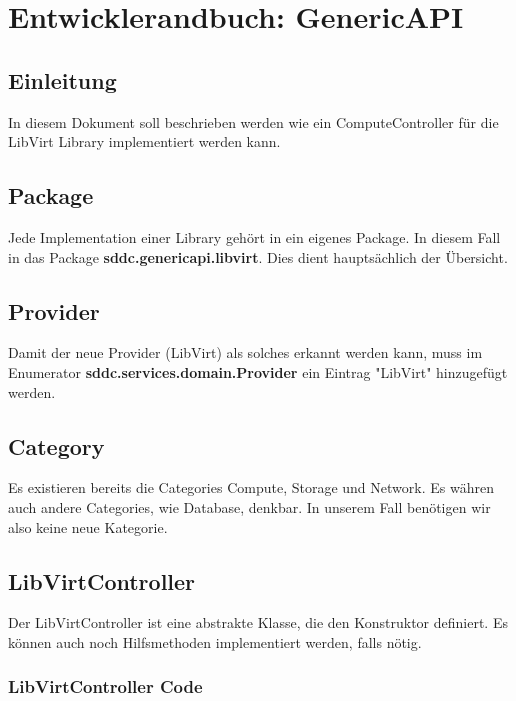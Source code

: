 \chapter{Entwicklerandbuch: GenericAPI}
\section{Einleitung}
In diesem Dokument soll beschrieben werden wie ein ComputeController für die LibVirt Library implementiert werden kann. 

\section{Package}
Jede Implementation einer Library gehört in ein eigenes Package. In diesem Fall in das Package \textbf{sddc.genericapi.libvirt}. Dies dient hauptsächlich der Übersicht.

\section{Provider}
Damit der neue Provider (LibVirt) als solches erkannt werden kann, muss im Enumerator \textbf{sddc.services.domain.Provider} ein Eintrag "LibVirt" hinzugefügt werden.

\section{Category}
Es existieren bereits die Categories Compute, Storage und Network. Es währen auch andere Categories, wie Database, denkbar. In unserem Fall benötigen wir also keine neue Kategorie.

\newpage

\section{LibVirtController}
Der LibVirtController ist eine abstrakte Klasse, die den Konstruktor definiert. Es können auch noch Hilfsmethoden implementiert werden, falls nötig.

\subsection{LibVirtController Code}

